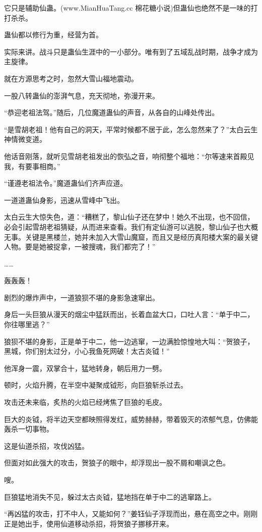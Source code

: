\begin{this_body}
它只是辅助仙蛊。(www.MianHuaTang.cc 棉花糖小说)但蛊仙也绝然不是一味的打打杀杀。

蛊仙都以修行为重，经营为首。

实际来讲。战斗只是蛊仙生涯中的一小部分。唯有到了五域乱战时期，战争才成为主旋律。

就在方源思考之时，忽然大雪山福地震动。

一股八转蛊仙的澎湃气息，充天彻地，弥漫开来。

“恭迎老祖法驾。”随后，几位魔道蛊仙的声音，从各自的山峰处传出。

“是雪胡老祖！他有自己的洞天，平常时候都不居于此，怎么忽然来了？”太白云生神情微变道。

他话音刚落，就听见雪胡老祖发出的恢弘之音，响彻整个福地：“尔等速来首殿见我，有要事相商。”

“谨遵老祖法令。”魔道蛊仙们齐声应道。

一道道蛊仙身影，迅速从雪峰中飞出。

太白云生大惊失色，道：“糟糕了，黎山仙子还在梦中！她久不出现，也不回信，必会引起雪胡老祖猜疑，从而进来查看。我们有定仙游可以逃脱，黎山仙子也大概无事。关键是黑楼兰，她并未加入大雪山魔窟，而且又是经历真阳楼大案的最关键人物。要是她被捉拿，一被搜魂，我们都完了！”

……

轰轰轰！

剧烈的爆炸声中，一道狼狈不堪的身影急速窜出。

身后一头巨狼从漫天的烟尘中猛跃而出，长着血盆大口，口吐人言：“单于中二，你往哪里逃？”

狼狈不堪的身影，正是单于中二，他一边逃窜，一边满脸惊惶地大叫：“贺狼子，黑城，你们别太过分，小心我鱼死网破！太古炎钺！”

他浑身一震，双掌合十，猛地转身，朝后用力一劈。

顿时，火焰升腾，在半空中凝聚成钺形，向巨狼斩杀过去。

攻击还未来临，炙热的火焰已经烤焦了巨狼的毛皮。

巨大的炎钺，将半边天空都映照得发红，威势赫赫，带着毁灭的浓郁气息，仿佛能轰杀一切事物。

这是仙道杀招，攻伐凶猛。

但面对如此强大的攻击，贺狼子的眼中，却浮现出一股不屑和嘲讽之色。

嗖。

巨狼猛地消失不见，躲过太古炎钺，猛地挡在单于中二的逃窜路上。

“再凶猛的攻击，打不中人，又能如何？”姜钰仙子浮现而出，悬在高空之中。刚刚正是她出手，使用仙道移动杀招，将贺狼子挪移开来。


\end{this_body}
